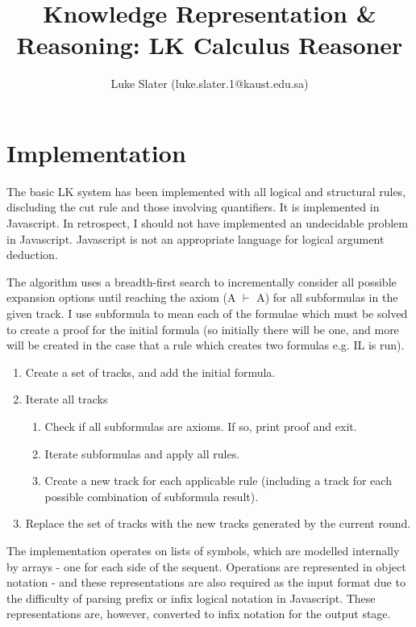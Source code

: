 \documentclass{article}
\begin{document}
\setlength{\parskip}{\medskipamount}
\setlength{\parindent}{0pt}

\title{Knowledge Representation \& Reasoning: LK Calculus Reasoner}
\author{Luke Slater (luke.slater.1@kaust.edu.sa)}

\maketitle

\pagebreak

\section{Implementation}

The basic LK system has been implemented with all logical and structural rules,
discluding the cut rule and those involving quantifiers. It is implemented in
Javascript. In retrospect, I should not have implemented an undecidable problem in
Javascript. Javascript is not an appropriate language for logical argument
deduction.

The algorithm uses a breadth-first search to incrementally consider all possible
expansion options until reaching the axiom (A $\vdash$ A) for all subformulas in
the given track. I use subformula to mean each of the formulae which must be
solved to create a proof for the initial formula (so initially there will be
one, and more will be created in the case that a rule which creates two formulas
e.g. IL is run).

\begin{enumerate}
  \item Create a set of tracks, and add the initial formula.
  \item Iterate all tracks
    \begin{enumerate}
      \item Check if all subformulas are axioms. If so, print proof and exit.
      \item Iterate subformulas and apply all rules.
      \item Create a new track for each applicable rule (including a track for each 
      possible combination of subformula result).
    \end{enumerate}
  \item Replace the set of tracks with the new tracks generated by the current
  round.
\end{enumerate}

The implementation operates on lists of symbols, which are modelled internally
by arrays - one for each side of the sequent. Operations are represented in
object notation - and these representations are also required as the input
format due to the difficulty of parsing prefix or infix logical notation in
Javascript. These representations are, however, converted to infix notation for
the output stage.
\end{document}

